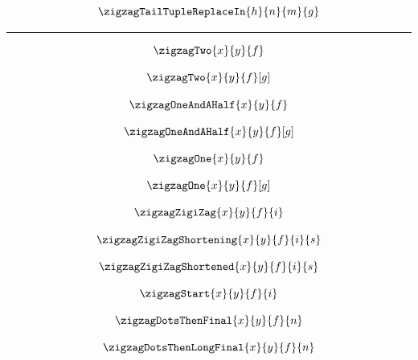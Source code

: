 \begin{showexample}
\[
\zigzagTailTupleReplaceIn{h}{n}{m}{g}
\]
\end{showexample}
\hrule

\begin{showexample}
\[
\arraycolsep=12pt
\zigzagTwo{x}{y}{f}
\]
\end{showexample}

\begin{showexample}
\[
\arraycolsep=7pt
\zigzagTwo{x}{y}{f}[g]
\]
\end{showexample}

\begin{showexample}
\[
\arraycolsep=7pt
\zigzagOneAndAHalf{x}{y}{f}
\]
\end{showexample}

\begin{showexample}
\[
\arraycolsep=7pt
\zigzagOneAndAHalf{x}{y}{f}[g]
\]
\end{showexample}

\begin{showexample}
\[
\arraycolsep=7pt
\zigzagOne{x}{y}{f}
\]
\end{showexample}

\begin{showexample}
\[
\arraycolsep=7pt
\zigzagOne{x}{y}{f}[g]
\]
\end{showexample}

\begin{showexample}
\[
\arraycolsep=7pt
\zigzagZigiZag{x}{y}{f}{i}
\]
\end{showexample}

\begin{showexample}
\[
\arraycolsep=7pt
\zigzagZigiZagShortening{x}{y}{f}{i}{s}
\]
\end{showexample}

\begin{showexample}
\[
\arraycolsep=7pt
\zigzagZigiZagShortened{x}{y}{f}{i}{s}
\]
\end{showexample}

\begin{showexample}
\[
\arraycolsep=7pt
\zigzagStart{x}{y}{f}{i}
\]
\end{showexample}

\begin{showexample}
\[
\arraycolsep=7pt
\zigzagDotsThenFinal{x}{y}{f}{n}
\]
\end{showexample}

\begin{showexample}
\[
\arraycolsep=7pt
\zigzagDotsThenLongFinal{x}{y}{f}{n}
\]
\end{showexample}

